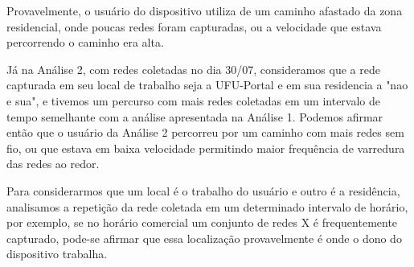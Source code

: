 \documentclass[12pt, %
openright, 
oneside,
a4paper,
brazil]{facom-ufu-abntex2}
\begin{document}
 Provavelmente, o usuário do dispositivo utiliza de um caminho afastado da zona residencial, onde poucas redes foram capturadas, ou a velocidade que estava percorrendo o caminho era alta.
 
 Já na Análise 2, com redes coletadas no dia 30/07, consideramos que a rede capturada em seu local de trabalho seja a UFU-Portal e em sua residencia a "nao e sua", e tivemos um percurso com mais redes coletadas em um intervalo de tempo semelhante com a análise apresentada na Análise 1. Podemos afirmar então que o usuário da Análise 2 percorreu por um caminho com mais redes sem fio, ou que estava em baixa velocidade permitindo maior frequência de varredura das redes ao redor.


Para considerarmos que um local é o trabalho do usuário e outro é a residência, analisamos a repetição da rede coletada em um determinado intervalo de horário, por exemplo, se no horário comercial um conjunto de redes X é frequentemente capturado, pode-se afirmar que essa localização provavelmente é onde o dono do dispositivo trabalha.
\end{document}
